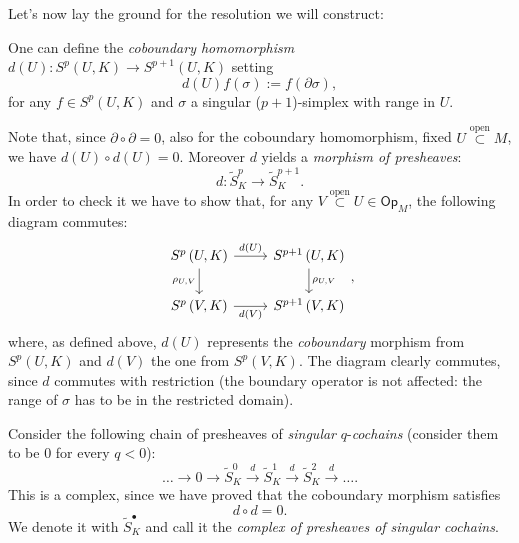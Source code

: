 Let's now lay the ground for the resolution we will construct:
\begin{defn}
	One can define the \textit{coboundary homomorphism} $d(U): S^p \left(U, K\right) \to S^{p+1} \left(U, K\right)$ setting
	\begin{equation}
		d(U)f (\sigma) := f(\partial \sigma)
	,\end{equation} 
	for any $f \in S^p \left(U, K\right)$ and $\sigma$ a singular ($p+1$)-simplex with range in $U$.
\end{defn}

\begin{rem}
	Note that, since $\partial \circ \partial = 0$, also for the coboundary homomorphism, fixed $U \stackrel{\text{open}}{\subset} M$, we have $d(U) \circ d(U) = 0$.
	Moreover $d$ yields a \textit{morphism of presheaves}:
	\begin{equation}
		d: \widetilde{S}_K^p \to \widetilde{S}_K^{p+1}
	.\end{equation}
	In order to check it we have to show that, for any $V \stackrel{\text{open}}{\subset} U \in \mathsf{Op}_M$, the following diagram commutes:
	\begin{equation}
	\begin{tikzcd}
		S^p \left(U, K\right) \arrow[r, "{d(U)}", rightarrow] \arrow[d, "{\rho_{U,V}}"', rightarrow] & S^{p+1} \left(U, K\right) \arrow[d, "{\rho_{U,V}}", rightarrow] \\
		S^p \left(V, K\right) \arrow[r, "{d(V)}"', rightarrow] & S^{p+1} \left(V, K\right)
	\end{tikzcd}
	,\end{equation} 
	where, as defined above, $d(U)$ represents the \textit{coboundary} morphism
	from $S^p \left(U, K\right)$ and $d(V)$ the one from $S^p \left(V, K\right)$.
	The diagram clearly commutes, since $d$ commutes with restriction
	(the boundary operator is not affected: the range of $\sigma$ has to be in the restricted domain).
\end{rem}

\begin{defn}\label{def:precocomp}
	Consider the following chain of presheaves of \textit{singular} $q$-\textit{cochains} (consider them to be $0$ for every $q < 0$):
	\begin{equation}
		\ldots \to 0 \to \widetilde{S}^0_K \xrightarrow{d} \widetilde{S}^1_K \xrightarrow{d} \widetilde{S}^2_K \xrightarrow{d} \ldots
	.\end{equation}
	This is a complex, since we have proved that the coboundary morphism satisfies
	\begin{equation}
	d \circ d = 0
	.\end{equation}
	We denote it with $\widetilde{S}^\bullet_K$ and call it the \textit{complex of presheaves of singular cochains}.
\end{defn}

